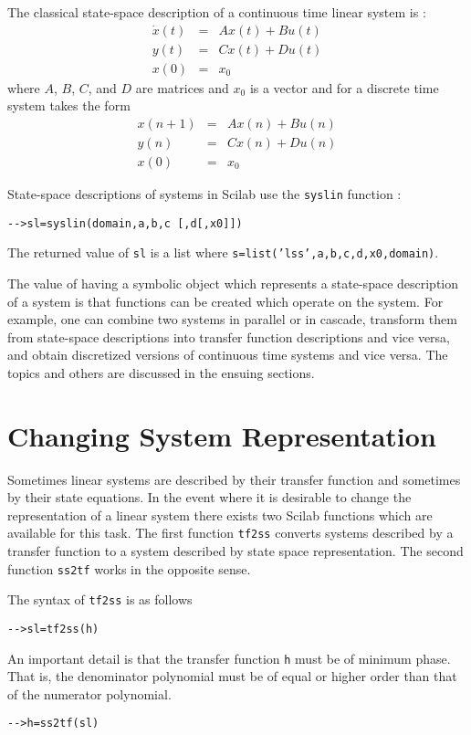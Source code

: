 	The classical state-space description of a continuous time linear 
system is :
\begin{eqnarray}
\dot{x}(t)&=&Ax(t)+Bu(t)\nonumber\\
y(t)&=&Cx(t)+Du(t)\nonumber\\
x(0)&=&x_0\nonumber
\end{eqnarray}
where $A$, $B$, $C$, and $D$ are matrices and $x_0$ is a vector
and for a discrete time system takes the form
\begin{eqnarray}
x(n+1)&=&Ax(n)+Bu(n)\nonumber\\
y(n)&=&Cx(n)+Du(n)\nonumber\\
x(0)&=&x_0\nonumber
\end{eqnarray}

	State-space descriptions of systems in Scilab 
use the {\tt syslin} function :
\begin{verbatim}
-->sl=syslin(domain,a,b,c [,d[,x0]])
\end{verbatim}
The returned value of {\tt sl} is a list where
{\tt s=list('lss',a,b,c,d,x0,domain)}.

	The value of having a symbolic object which represents
a state-space description of a system is that functions can be created
which operate on the system.  For example, one can combine two systems
in parallel or in cascade, transform them from state-space descriptions
into transfer function descriptions and vice versa, and obtain
discretized versions of continuous time systems and vice versa.
The topics and others are discussed in the ensuing sections.

\section{Changing System Representation}

	Sometimes linear systems are described by their transfer function
and sometimes by their state equations.  In the event where it is
desirable to change the representation of a linear system there exists two
Scilab functions which are available for this task.  The first function
{\tt tf2ss} converts systems described by a transfer function
to a system described by state space representation.  The second
function {\tt ss2tf} works in the opposite sense.

	The syntax of {\tt tf2ss} is as follows
\begin{verbatim}
-->sl=tf2ss(h)
\end{verbatim}	
An important detail is that the
transfer function {\tt h} must be of minimum phase.  That is, the
denominator polynomial must be of equal or higher order than that
of the numerator polynomial.
\begin{verbatim}
-->h=ss2tf(sl)
\end{verbatim}	

